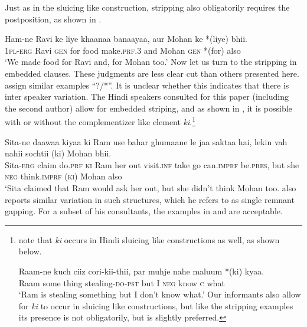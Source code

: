 \documentclass[output=paper]{langscibook}
\begin{document}
\ea \label{maex7}
    \z 
\z 
Just as in the sluicing like construction, stripping also obligatorily requires the postposition, as shown in .

\ea \label{maex8}
    \gll Ham-ne Ravi ke liye khaanaa banaayaa, aur Mohan ke *(liye) bhii.\\
    \textsc{1pl-erg} Ravi \textsc{gen} for food make.\textsc{prf.3} and Mohan \textsc{gen} *(for) also\\
    \glt `We made food for Ravi and, for Mohan too.'
\z 
Now let us turn to the stripping in embedded clauses. These judgments are less clear cut than others presented here. \citet{gribanova16} assign similar examples ``?/*''. It is unclear whether this indicates that there is inter speaker variation. The Hindi speakers consulted for this paper (including the second author) allow for embedded striping, and as shown in , it is possible with or without the complementizer like element \emph{ki}.\footnote{\citet{Bhattacharya12} note that \emph{ki} occurs in Hindi sluicing like constructions as well, as shown below.

\ea \label{maex9a}
    \gll Raam-ne kuch ciiz cori-kii-thii, par muhje nahe maluum *(ki) kyaa.\\
    Raam some thing stealing-\textsc{do-pst} but I \textsc{neg} know \textsc{c} what\\
    \glt `Ram is stealing something but I don't know what.' \hfill \citep[199]{Bhattacharya12}
\z 
Our informants also allow for \emph{ki} to occur in sluicing like constructions, but like the stripping examples its presence is not obligatorily, but is slightly preferred.}

\ea \label{maex9}
    \gll Sita-ne daawaa kiyaa ki Ram use bahar ghumaane le jaa saktaa hai, lekin vah nahii sochtii (ki) Mohan bhii.\\
    Sita-\textsc{erg} claim do.\textsc{prf} \textsc{ki} Ram her out visit.\textsc{inf} take go can.\textsc{imprf} be.\textsc{pres}, but she \textsc{neg} think.\textsc{imprf} (\textsc{ki}) Mohan also\\
    \glt `Sita claimed that Ram would ask her out, but she didn't think Mohan too.
\z 
\citet{kush16} also reports similar variation in such structures, which he refers to as single remnant gapping. For a subset of his consultants, the examples in  and  are acceptable.
\end{document}

